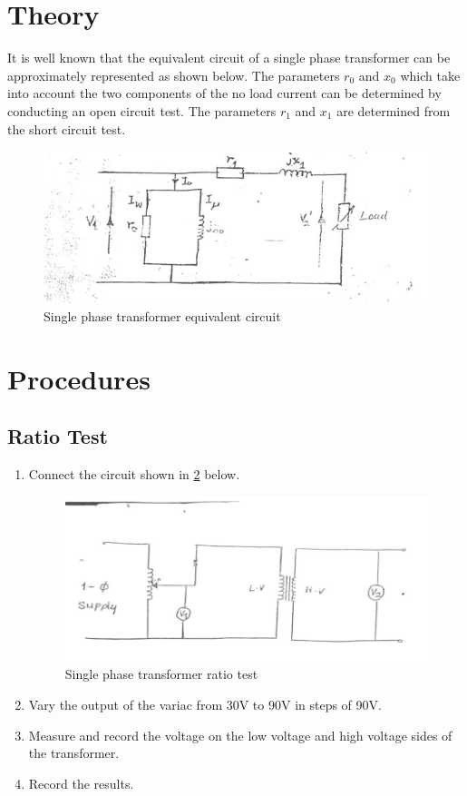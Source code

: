 \documentclass[12pt,a4paper]{report}
\begin{document}
\section{Theory}
It is well known that the equivalent circuit of a single phase transformer can be approximately represented as shown below. The parameters $r_{0}$ and $x_{0}$ which take into account the two components of the no load current can be determined by conducting an open circuit test. The parameters $r_{1}$ and $x_{1}$ are determined from the short circuit test.
\begin{figure}[H]
    \centering
    \includegraphics[width=0.8\linewidth]{figure_1_1.jpeg}
    \caption{Single phase transformer equivalent circuit}
    \label{fig_1}
\end{figure}

\section{Procedures}
\subsection{Ratio Test}
\begin{enumerate}
    \item Connect the circuit shown in \ref{fig_2} below. 
    \begin{figure}[H]
        \centering
        \includegraphics[width=0.8\linewidth]{figure_2_2.jpeg}
        \caption{Single phase  transformer ratio test}
        \label{fig_2}
    \end{figure}
    \item Vary the output of the variac from 30V to 90V in steps of 90V.
    \item Measure and record the voltage on the low voltage and high voltage sides of the transformer.
    \item Record the results.
\end{enumerate}
\end{document}
